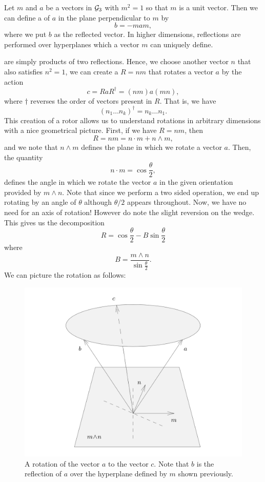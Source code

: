 Let $m$ and $a$ be a vectors in $\mathcal{G}_3$ with $m^2 = 1$ so that $m$ is a unit vector.  Then we can define a  of $a$ in the plane perpendicular to $m$ by
\[
b=-mam,
\]
where we put $b$ as the reflected vector. In higher dimensions, reflections are performed over hyperplanes which a vector $m$ can uniquely define. 

 are simply products of two reflections.  Hence, we choose another vector $n$ that also satisfies $n^2=1$, we can create a  $R=nm$ that rotates a vector $a$ by the action
\[
c = RaR^\dagger = (nm)a(mn),
\]
where $\dagger$ reverses the order of vectors present in $R$. That is, we have
\[
(n_1 \dots n_k)^\dagger = n_k \dots n_1.
\]
This creation of a rotor allows us to understand rotations in arbitrary dimensions with a nice geometrical picture.  First, if we have $R=nm$, then
\[
R = nm = n\cdot m + n\wedge m,
\]
and we note that $n\wedge m$ defines the plane in which we rotate a vector $a$.  Then, the quantity
\[
n\cdot m = \cos \frac{\theta}{2},
\]
defines the angle in which we rotate the vector $a$ in the given orientation provided by $m\wedge n$.  Note that since we perform a two sided operation, we end up rotating by an angle of $\theta$ although $\theta/2$ appears throughout. Now, we have no need for an axis of rotation! However do note the slight reversion on the wedge. This gives us the decomposition
\[
R=\cos \frac{\theta}{2} - B \sin \frac{\theta}{2}
\]
where
\[
B=\frac{m\wedge n}{\sin \frac{\theta}{2}}.
\]
We can picture the rotation as follows:
\begin{figure}[H]
    \centering
    \includegraphics[width=.8\textwidth]{figures/rotation.png}
    \caption{A rotation of the vector $a$ to the vector $c$. Note that $b$ is the reflection of $a$ over the hyperplane defined by $m$ shown previously.}
    \label{fig:rotors}
\end{figure}

